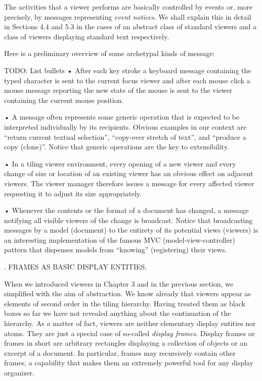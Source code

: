 The activities that a viewer performs are basically controlled by
events or, more precisely, by messages representing {\it event notices\/}. We
shall explain this in detail in Sections 4.4 and 5.3 in the cases of
an abstract class of standard viewers and a class of viewers
displaying standard text respectively.

Here is a preliminary overview of some archetypal kinds of message:

TODO: List bullets
• After each key stroke a keyboard message containing the typed character is sent to the current focus viewer and after each mouse click a mouse message reporting the new state of the mouse is sent to the viewer containing the current mouse position.

• A message often represents some generic operation that is expected to be interpreted individually by its recipients. Obvious examples in our context are ``return current textual selection'', ``copy-over stretch of text'', and ``produce a copy (clone)''. Notice that generic operations are the key to extensibility.

• In a tiling viewer environment, every opening of a new viewer and every change of size or location of an existing viewer has an obvious effect on adjacent viewers. The viewer manager therefore issues a message for every affected viewer requesting it to adjust its size appropriately.

• Whenever the contents or the format of a document has changed, a message notifying all visible viewers of the change is broadcast. Notice that broadcasting messages by a model (document) to the entirety of its potential views (viewers) is an interesting implementation of the famous MVC (model-view-controller) pattern that dispenses models from ``knowing'' (registering) their views.

. FRAMES AS BASIC DISPLAY ENTITIES.

When we introduced viewers in Chapter 3 and in the previous section,
we simplified with the aim of abstraction. We know already that
viewers appear as elements of second order in the tiling
hierarchy. Having treated them as black boxes so far we have not
revealed anything about the continuation of the hierarchy. As a matter
of fact, viewers are neither elementary display entities nor
atoms. They are just a special case of so-called {\it display frames\/}. Display frames or frames in short are arbitrary rectangles
displaying a collection of objects or an excerpt of a document. In
particular, frames may recursively contain other frames, a capability
that makes them an extremely powerful tool for any display organizer.

